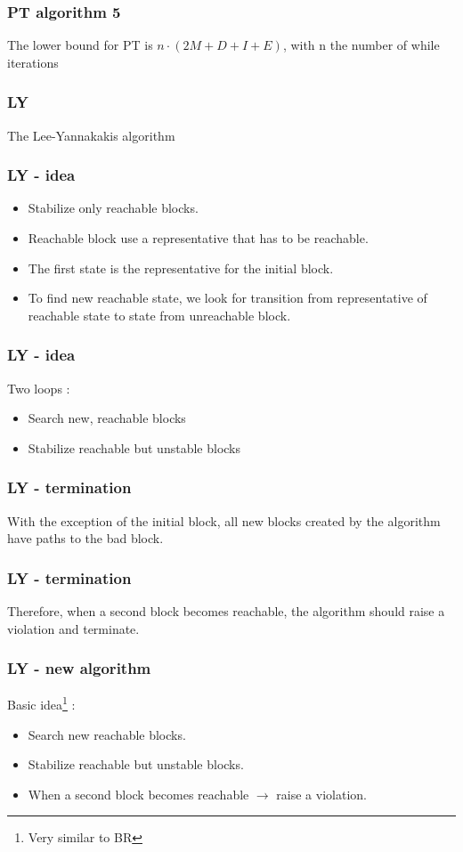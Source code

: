 \documentclass[11pt,handout]{beamer}
\begin{document}
\begin{frame}
 \frametitle{PT algorithm 5}
The lower bound for PT is $n \cdot (2M + D + I + E)$, with n the number of while iterations
\end{frame}


\begin{frame}
  \frametitle{LY}
  The Lee-Yannakakis algorithm
\end{frame}

\begin{frame}
  \frametitle{LY - idea}
  \begin{itemize}
  \item Stabilize only reachable blocks.
  \item Reachable block use a representative that has to be reachable.
  \item The first state is the representative for the initial block.
  \item To find new reachable state, we look for transition from representative
    of reachable state to state from unreachable block.
  \end{itemize}
\end{frame}

\begin{frame}
  \frametitle{LY - idea}
  Two loops :
  \begin{itemize}
  \item Search new, reachable blocks
  \item Stabilize reachable but unstable blocks
  \end{itemize}
\end{frame}

\begin{frame}
  \frametitle{LY - termination}
  With the exception of the initial block, all new blocks created by the
  algorithm have paths to the bad block.
\end{frame}

\begin{frame}
  \frametitle{LY - termination}
  Therefore, when a second block becomes reachable, the algorithm should raise a
  violation and terminate.
\end{frame}

\begin{frame}
  \frametitle{LY - new algorithm}
  Basic idea\footnote{Very similar to BR} :
  \begin{itemize}
  \item Search new reachable blocks.
  \item Stabilize reachable but unstable blocks.
  \item When a second block becomes reachable $\to$ raise a violation.
  \end{itemize}
\end{frame}
\end{document}
